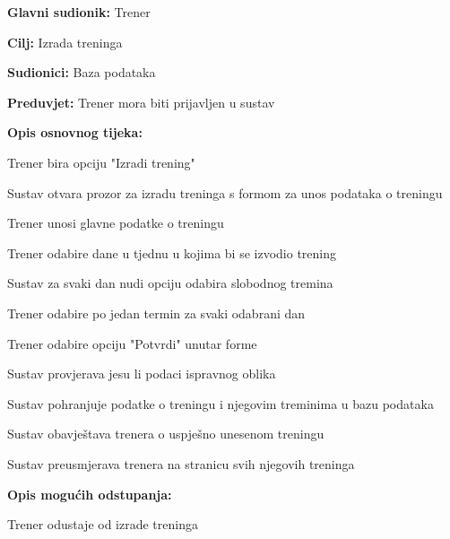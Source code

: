 					\noindent {}
					\begin{packed_item}
	
						\item \textbf{Glavni sudionik: }Trener
						\item  \textbf{Cilj:} Izrada treninga
						\item  \textbf{Sudionici:} Baza podataka
						\item  \textbf{Preduvjet:} Trener mora biti prijavljen u sustav
						\item  \textbf{Opis osnovnog tijeka:}
						
						\item[] \begin{packed_enum}
	
							\item Trener bira opciju "Izradi trening"
							\item Sustav otvara prozor za izradu treninga s formom za unos podataka o treningu
							\item Trener unosi glavne podatke o treningu
       					\item Trener odabire dane u tjednu u kojima bi se izvodio trening
							\item Sustav za svaki dan nudi opciju odabira slobodnog tremina
							\item Trener odabire po jedan termin za svaki odabrani dan
							\item Trener odabire opciju "Potvrdi" unutar forme
                            \item Sustav provjerava jesu li podaci ispravnog oblika
                            \item Sustav pohranjuje podatke o treningu i njegovim treminima u bazu podataka
                            \item Sustav obavještava trenera o uspješno unesenom treningu
                            \item Sustav preusmjerava trenera na stranicu svih njegovih treninga
						\end{packed_enum}
						
						\item  \textbf{Opis mogućih odstupanja:}
						
						\item[] \begin{packed_item}
	
							\item[8.a] Trener odustaje od izrade treninga
							\item[] \begin{packed_enum}
								

\end{packed_enum}
\end{packed_item}
\end{packed_item}
